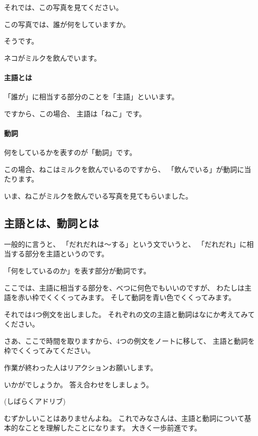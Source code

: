 \documentclass[book,jafontscale=0.9247]{jlreq}
\newcommand{\mySagyo}{%
\begin{minipage}[t]{.98\textwidth}
\mbox{}\hrulefill\mbox{}\par%
\mbox{}\hfill{}\raisebox{-5pt}{作業}\hfill\mbox{}\par%
\mbox{}\hrulefill\mbox{}
\end{minipage}%
\par%
\bigskip
}
\begin{document}
それでは、この写真を見てください。

この写真では、誰が何をしていますか。

そうです。

ネコがミルクを飲んでいます。

\paragraph{主語とは}
「誰が」に相当する部分のことを「主語」といいます。

ですから、この場合、
主語は「ねこ」です。

\paragraph{動詞}
何をしているかを表すのが「動詞」です。

この場合、ねこはミルクを飲んでいるのですから、
「飲んでいる」が動詞に当たります。

いま、ねこがミルクを飲んでいる写真を見てもらいました。

{\large \ComputerMouse}

\subsection{主語とは、動詞とは}


一般的に言うと、
「だれだれは〜する」という文でいうと、
「だれだれ」に相当する部分を主語というのです。

「何をしているのか」を表す部分が動詞です。

ここでは、主語に相当する部分を、べつに何色でもいいのですが、
わたしは主語を赤い枠でくくくってみます。
そして動詞を青い色でくくってみます。

{\large \ComputerMouse}

それでは4つ例文を出しました。
それぞれの文の主語と動詞はなにか考えてみてください。

さあ、ここで時間を取りますから、4つの例文をノートに移して、
主語と動詞を枠でくくってみてください。

作業が終わった人はリアクションお願いします。


\mySagyo


いかがでしょうか。
答え合わせをしましょう。

{\large \ComputerMouse}

(しばらくアドリブ)

むずかしいことはありませんよね。
これでみなさんは、主語と動詞について基本的なことを理解したことになります。
大きく一歩前進です。
\end{document}
